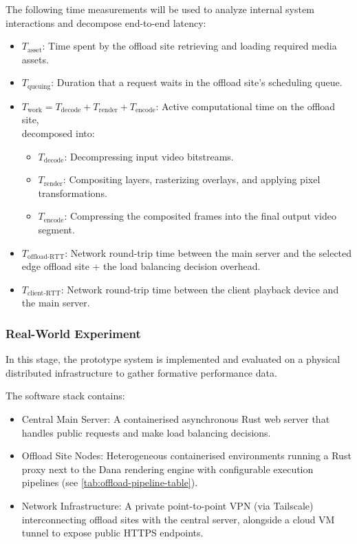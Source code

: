 \documentclass[11pt,a4paper]{article}
\begin{document}
The following time measurements will be used to analyze internal system interactions and decompose end-to-end latency:
\begin{itemize}
    \item $T_\text{asset}$: Time spent by the offload site retrieving and loading required media assets.
    \item $T_\text{queuing}$: Duration that a request waits in the offload site's scheduling queue.
    \item $T_\text{work} = T_\text{decode} + T_\text{render} + T_\text{encode}$: Active computational time on the offload site, \\ decomposed into:
    \begin{itemize}
        \item $T_\text{decode}$: Decompressing input video bitstreams.
        \item $T_\text{render}$: Compositing layers, rasterizing overlays, and applying pixel transformations.
        \item $T_\text{encode}$: Compressing the composited frames into the final output video segment.
    \end{itemize}
    \item $T_\text{offload-RTT}$: Network round-trip time between the main server and the selected edge offload site + the load balancing decision overhead.
    \item $T_\text{client-RTT}$: Network round-trip time between the client playback device and the main server.
\end{itemize}

\subsubsection{Real-World Experiment}
\label{sec:Experiment}

In this stage, the prototype system is implemented and evaluated on a physical distributed infrastructure to gather formative performance data.

The software stack contains:
\begin{itemize}
    \item Central Main Server: A containerised asynchronous Rust web server that handles public requests and make load balancing decisions.
    \item Offload Site Nodes: Heterogeneous containerised environments running a Rust proxy next to the Dana rendering engine with configurable execution pipelines (see \autoref{tab:offload-pipeline-table}).
    \item Network Infrastructure: A private point-to-point VPN (via Tailscale) interconnecting offload sites with the central server, alongside a cloud VM tunnel to expose public HTTPS endpoints.
\end{itemize}
\end{document}
